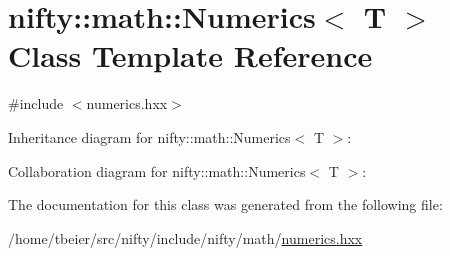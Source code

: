 \hypertarget{classnifty_1_1math_1_1Numerics}{}\section{nifty\+:\+:math\+:\+:Numerics$<$ T $>$ Class Template Reference}
\label{classnifty_1_1math_1_1Numerics}


{\ttfamily \#include $<$numerics.\+hxx$>$}



Inheritance diagram for nifty\+:\+:math\+:\+:Numerics$<$ T $>$\+:


Collaboration diagram for nifty\+:\+:math\+:\+:Numerics$<$ T $>$\+:


The documentation for this class was generated from the following file\+:\begin{DoxyCompactItemize}
\item 
/home/tbeier/src/nifty/include/nifty/math/\hyperlink{numerics_8hxx}{numerics.\+hxx}\end{DoxyCompactItemize}
